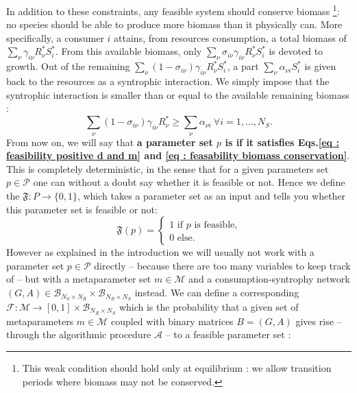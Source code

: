 \documentclass[12pt, titlepage]{report}
\begin{document}
In addition to these constraints, any feasible system should conserve biomass \footnote{This weak condition should hold only at equilibrium : we allow transition periods where biomass may not be conserved.}: no species should be able to produce more biomass than it physically can. More specifically, a consumer $i$ attains, from resources consumption, a total biomass of $\sum_\nu \gamma_{i\nu}R^*_\nu S^*_i$.
From this available biomass, only $\sum_\nu \sigma_{i\nu}\gamma_{i\nu}R^*_\nu S^*_i$ is devoted to growth. Out of the remaining $\sum_\nu (1-\sigma_{i\nu})\gamma_{i\nu}R^*_\nu S^*_i$, a part $\sum_\nu \alpha_{\nu i} S^*_i$ is given back to the resources as a syntrophic interaction. We simply impose that the syntrophic interaction is smaller than or equal to the available remaining biomass :
\begin{equation}\label{eq : feasability biomass conservation}
 \sum_\nu (1-\sigma_{i\nu})\gamma_{i\nu}R^*_\nu  \geq \sum_\nu \alpha_{\nu i} \ \forall i=1, \dots, N_S.
\end{equation}
From now on, we will say that \textbf{a parameter set $p$ is  if it satisfies Eqs.\eqref{eq : feasibility positive d and m} and \eqref{eq : feasability biomass conservation}}.
This is completely deterministic, in the sense that for a given parameters set $p \in \mathcal{P}$ one can without a doubt say whether it is feasible or not.
Hence we define the  $\mathfrak{F} : P \rightarrow \{ 0, 1 \}$, which takes a parameter set as an input and tells you whether this parameter set is feasible or not:
\begin{equation}
\mathfrak{F}(p)=
\begin{cases}
1 \text{ if }p \text{ is feasible,} \\
0 \text{ else.}
\end{cases}
\end{equation}
However as explained in the introduction we will usually not work with a parameter set $p \in \mathcal{P}$ directly -- because there are too many variables to keep track of -- but with a metaparameter set $m \in \mathcal{M}$ and a consumption-syntrophy network $(G,A) \in \mathcal{B}_{N_S \times N_R} \times \mathcal{B}_{N_R \times N_S}$ instead. We can  define a corresponding
 $\mathcal{F} : \mathcal{M} \rightarrow [0, 1] \times \mathcal{B}_{N_R \times N_S}$ which is the probability that a given set of metaparameters $m \in \mathcal{M}$ coupled with binary matrices $B=(G, A)$ gives rise -- through the algorithmic procedure $\mathcal{A}$ -- to a feasible parameter set :
\end{document}
